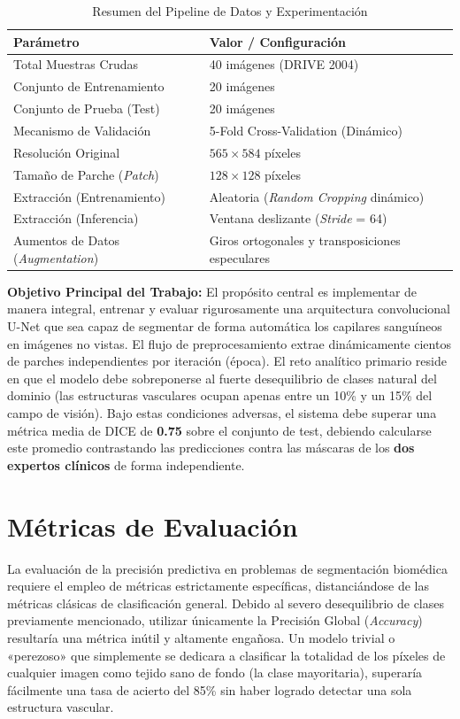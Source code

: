 \documentclass[conference]{IEEEtran}
\begin{document}
\begin{table}[htbp]
\centering
\caption{Resumen del Pipeline de Datos y Experimentación}
\label{tab:pipeline_summary}
\begin{tabular}{@{}p{3.5cm}p{4.5cm}@{}}
\toprule
\textbf{Parámetro} & \textbf{Valor / Configuración} \\
\midrule
Total Muestras Crudas & 40 imágenes (DRIVE 2004) \\
Conjunto de Entrenamiento & 20 imágenes \\
Conjunto de Prueba (Test) & 20 imágenes \\
Mecanismo de Validación & 5-Fold Cross-Validation (Dinámico) \\
Resolución Original & $565 \times 584$ píxeles \\
Tamaño de Parche (\textit{Patch}) & $128 \times 128$ píxeles \\
Extracción (Entrenamiento) & Aleatoria (\textit{Random Cropping} dinámico) \\
Extracción (Inferencia) & Ventana deslizante (\textit{Stride} = 64) \\
Aumentos de Datos (\textit{Augmentation}) & Giros ortogonales y transposiciones especulares \\
\bottomrule
\end{tabular}
\end{table}

\textbf{Objetivo Principal del Trabajo:} El propósito central es implementar de manera integral, entrenar y evaluar rigurosamente una arquitectura convolucional U-Net que sea capaz de segmentar de forma automática los capilares sanguíneos en imágenes no vistas. El flujo de preprocesamiento extrae dinámicamente cientos de parches independientes por iteración (época). El reto analítico primario reside en que el modelo debe sobreponerse al fuerte desequilibrio de clases natural del dominio (las estructuras vasculares ocupan apenas entre un 10\% y un 15\% del campo de visión). Bajo estas condiciones adversas, el sistema debe superar una métrica media de DICE de \textbf{0.75} sobre el conjunto de test, debiendo calcularse este promedio contrastando las predicciones contra las máscaras de los \textbf{dos expertos clínicos} de forma independiente.

\section{Métricas de Evaluación}
La evaluación de la precisión predictiva en problemas de segmentación biomédica requiere el empleo de métricas estrictamente específicas, distanciándose de las métricas clásicas de clasificación general. Debido al severo desequilibrio de clases previamente mencionado, utilizar únicamente la Precisión Global (\textit{Accuracy}) resultaría una métrica inútil y altamente engañosa. Un modelo trivial o «perezoso» que simplemente se dedicara a clasificar la totalidad de los píxeles de cualquier imagen como tejido sano de fondo (la clase mayoritaria), superaría fácilmente una tasa de acierto del 85\% sin haber logrado detectar una sola estructura vascular.
\end{document}
